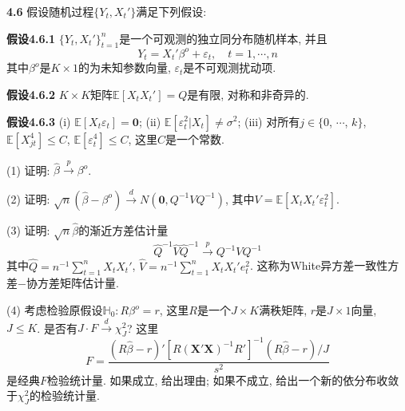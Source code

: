 \documentclass[cn,12pt,math=mtpro2,citestyle=gb7714-2015,bibstyle=gb7714-2015,twocol,mode=simple]{elegantbook}
\newcommand{\E}{\mathbb{E}}
\newcommand{\hbeta}{\hat{\beta}}
\begin{document}
\textbf{4.6} 假设随机过程$\{Y_t,X_t'\}$满足下列假设:

\textbf{假设4.6.1} $\{Y_t,X_t'\}_{t=1}^n$是一个可观测的独立同分布随机样本, 并且
 $$Y_t=X_t'\beta^o+\varepsilon_t,\quad t=1,\cdots,n$$
 其中$\beta^o$是$K\times1$的为未知参数向量, $\varepsilon_t$是不可观测扰动项.

\textbf{假设4.6.2} $K\times K$矩阵$\E[X_tX_t']=Q$是有限, 对称和非奇异的.

\textbf{假设4.6.3} (i) $\E[X_t\varepsilon_t]=\mathbf{0}$; (ii) $\E[\varepsilon_t^2|X_t]\neq \sigma^2$; (iii) 对所有$j \in \{0$, $\cdots$, $k\}$, $\E[X_{jt}^4]\leq C$, $\E[\varepsilon_t^4]\leq C$, 这里$C$是一个常数.

(1) 证明: $\hbeta\xrightarrow{p}{\beta}^o$.

(2) 证明: $\sqrt{n}(\hbeta-\beta^o)\xrightarrow{d}N(\mathbf{0},Q^{-1}VQ^{-1})$, 其中$V=\E[X_tX_t'\varepsilon_t^2]$.

(3) 证明: $\sqrt{n}\hbeta$的渐近方差估计量
  $$\hat{Q}^{-1}\hat{V}\hat{Q}^{-1}\xrightarrow{p}Q^{-1}VQ^{-1}$$
  其中$\displaystyle\hat{Q}=n^{-1}\sum_{t=1}^{n}X_tX_t'$, $\displaystyle\hat{V}=n^{-1}\sum_{t=1}^{n}X_tX_t'e_t^2$. 这称为White异方差一致性方差$-$协方差矩阵估计量.

(4) 考虑检验原假设$\mathbb{H}_0: R\beta^o=r$, 这里$R$是一个$J\times K$满秩矩阵, $r$是$J\times 1$向量, $J\leq K$. 是否有$J\cdot F\xrightarrow{d}\chi^2_J$? 这里
  $$F=\frac{(R\hbeta-r)'[R(\mathbf{X}{'}\mathbf{X})^{-1}R']^{-1}(R\hbeta-r)/J}{s^{2}}$$
  是经典$F$检验统计量. 如果成立, 给出理由; 如果不成立, 给出一个新的依分布收敛于$\chi^2_J$的检验统计量.
\end{document}
